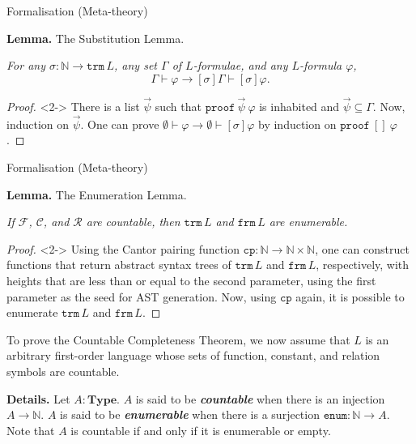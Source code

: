 \documentclass[serif,table,10pt]{beamer}
\newcommand{\IN}{\mathbb{N}}
\newcommand{\0}{\texttt{0}}
\newcommand{\1}{\texttt{1}}
\newcommand{\inlinedef}[1]{\emph{\textbf{#1}}}
\newcommand{\Type}{\mathbf{Type}}
\newcommand{\proves}[2]{\mathtt{proof}\ #1\ #2 }
\begin{document}
\begin{frame}{Formalisation (Meta-theory)}

    \textbf{Lemma.} The Substitution Lemma.
    
    \emph{For any $\sigma : \IN \to \mathtt{trm} \, L$, any set $\Gamma$ of $L$-formulae, and any $L$-formula $\varphi$, \[ \Gamma \vdash \varphi \to [\sigma] \Gamma \vdash [\sigma] \varphi . \]}

    \begin{proof}<2->
        There is a list $\vec\psi$ such that $\proves{\vec\psi}{\varphi}$ is inhabited and $\vec\psi \subseteq \Gamma$. Now, induction on  $\vec\psi$. One can prove $ \emptyset \vdash \varphi \to \emptyset \vdash [ \sigma ] \varphi $ by induction on $\proves{[]}{\varphi}$.
    \end{proof}

\end{frame}

\begin{frame}{Formalisation (Meta-theory)}

    \textbf{Lemma.} The Enumeration Lemma.

    \begin{center}
        \emph{If $\mathcal{F}$, $\mathcal{C}$, and $\mathcal{R}$ are countable, then $\mathtt{trm} \, L$ and $\mathtt{frm} \, L$ are enumerable.}
    \end{center}

    \begin{proof}<2->
        Using the Cantor pairing function $\mathtt{cp} : \IN \to \IN \times \IN $, one can construct functions that return abstract syntax trees of $\mathtt{trm} \, L$ and $\mathtt{frm} \, L$, respectively, with heights that are less than or equal to the second parameter, using the first parameter as the seed for AST generation.
        Now, using $\mathtt{cp}$ again, it is possible to enumerate $\mathtt{trm} \, L$ and $\mathtt{frm} \, L$.
    \end{proof}

    To prove the Countable Completeness Theorem, we now assume that $L$ is an arbitrary first-order language whose sets of function, constant, and relation symbols are countable.

    \textbf{Details.}
    Let $A : \Type$. $A$ is said to be \inlinedef{countable} when there is an injection $A \to \IN$. $A$ is said to be \inlinedef{enumerable} when there is a surjection $\mathtt{enum} : \IN \to A$. Note that $A$ is countable if and only if it is enumerable or empty.

\end{frame}
\end{document}

